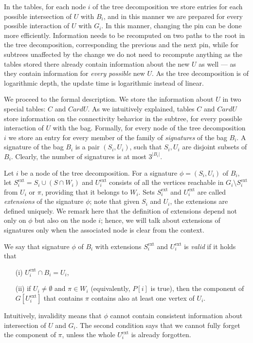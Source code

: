 \documentclass[a4paper,11pt]{article}
\theoremstyle{definition}
\theoremstyle{remark}
\newcommand{\ext}{\textrm{ext}}
\newcommand{\pin}{\pi}
\begin{document}
In the tables, for each node $i$ of the tree decomposition we store
entries for each possible intersection of $U$ with $B_i$, and in this
manner we are prepared for every possible interaction of $U$ with
$G_i$.  In this manner, changing the pin can be done more efficiently.
Information needs to be recomputed on two paths to the root in the
tree decomposition, corresponding the previous and the next pin, while
for subtrees unaffected by the change we do not need to recompute
anything as the tables stored there already contain information about
the new $U$ as well --- as they contain information for {\emph{every
    possible}} new $U$.  As the tree decomposition is of logarithmic
depth, the update time is logarithmic instead of linear.

We proceed to the formal description.  We store the information about
$U$ in two special tables: $C$ and $CardU$.  As we intuitively
explained, tables $C$ and $CardU$ store information on the
connectivity behavior in the subtree, for every possible interaction
of $U$ with the bag.  Formally, for every node of the tree
decomposition $i$ we store an entry for every member of the family of
{\emph{signatures}} of the bag $B_i$.  A signature of the bag $B_i$ is
a pair $(S_i,U_i)$, such that $S_i,U_i$ are disjoint subsets of $B_i$.
Clearly, the number of signatures is at most $3^{|B_i|}$.

Let $i$ be a node of the tree decomposition.  For a signature
$\phi=(S_i,U_i)$ of $B_i$, let $S^{\ext}_i=S_i\cup (S\cap W_i)$ and
$U^{\ext}_i$ consists of all the vertices reachable in $G_i\setminus
S^{\ext}_i$ from $U_i$ or $\pin$, providing that it belongs to $W_i$.
Sets $S^{\ext}_i$ and $U^{\ext}_i$ are called {\emph{extensions}} of
the signature $\phi$; note that given $S_i$ and $U_i$, the extensions
are defined uniquely.  We remark here that the definition of
extensions depend not only on $\phi$ but also on the node $i$; hence,
we will talk about extensions of signatures only when the associated
node is clear from the context.

We say that signature $\phi$ of $B_i$ with extensions $S^{\ext}_i$ and
$U^{\ext}_i$ is {\emph{valid}} if it holds that
\begin{itemize}
\item[(i)] $U^\ext_i\cap B_i=U_i$,
\item[(ii)] if $U_i\neq \emptyset$ and $\pin\in W_i$ (equivalently, $P[i]$ is 
  true), then the
  component of $G[U^{\ext}_i]$ that contains $\pin$ contains also at
  least one vertex of $U_i$.
\end{itemize}
Intuitively, invalidity means that $\phi$ cannot contain consistent
information about intersection of $U$ and $G_i$.  The second condition
says that we cannot fully forget the component of $\pin$, unless the
whole $U^{\ext}_i$ is already forgotten.
\end{document}
